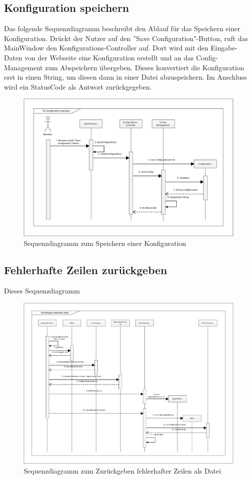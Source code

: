 \subsection{Konfiguration speichern}
Das folgende Sequenzdiagramm beschreibt den Ablauf für das Speichern einer Konfiguration.
Drückt der Nutzer auf den ”{Save Configuration}"{-Button}, ruft das MainWindow den Konfigurations-Controller auf.
Dort wird mit den Eingabe-Daten von der Webseite eine Konfiguration erstellt und an das Config-Management zum Abspeichern übergeben.
Dieses konvertiert die Konfiguration erst in einen String, um diesen dann in einer Datei abzuspeichern.
Im Anschluss wird ein StatusCode als Antwort zurückgegeben.
\begin{figure}[htbp]
\centering
\includegraphics[scale=0.44]{uml/SD_saveConfig.eps}
\caption{Sequenzdiagramm zum Speichern einer Konfiguration}
\end{figure}

\clearpage
\subsection{Fehlerhafte Zeilen zurückgeben}

Dieses Sequenzdiagramm 

\begin{figure}[htbp]
\centering
\includegraphics[scale=0.44]{uml/SD_returnErrors.eps}
\caption{Sequenzdiagramm zum Zurückgeben fehlerhafter Zeilen als Datei}
\end{figure}

